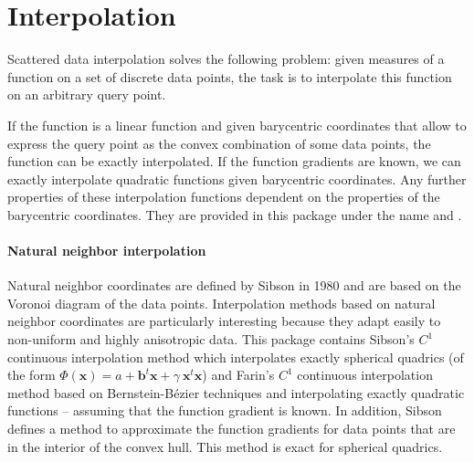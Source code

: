 
\chapter{Interpolation}
\label{chap:Interpolation}

Scattered data interpolation solves the following problem: given
measures of a function on a set of discrete data points, the task is
to interpolate this function on an arbitrary query point.

If the function is a linear function and given barycentric coordinates
that allow to express the query point as the convex combination of
some data points, the function can be exactly interpolated. If the
function gradients are known, we can exactly interpolate quadratic
functions given barycentric coordinates. Any further properties of
these interpolation functions dependent on the properties of the
barycentric coordinates. They are provided in this package under the
name  and
.\medskip

\subsubsection{Natural neighbor interpolation} Natural neighbor
coordinates are defined by Sibson in 1980 and are based on the Voronoi
diagram of the data points. Interpolation methods based on natural
neighbor coordinates are particularly interesting because they adapt
easily to non-uniform and highly anisotropic data.  This package
contains Sibson's $C^1$ continuous interpolation method which
interpolates exactly spherical quadrics (of the form $\Phi(\mathbf{x})
=a + \mathbf{b}^t \mathbf{x} +\gamma\ \mathbf{x}^t\mathbf{x}$) and
Farin's $C^1$ continuous interpolation method based on
Bernstein-B\'ezier techniques and interpolating exactly quadratic
functions -- assuming that the function gradient is known. In
addition, Sibson defines a method to approximate the function
gradients for data points that are in the interior of the convex hull.
This
method is exact for spherical quadrics.%

